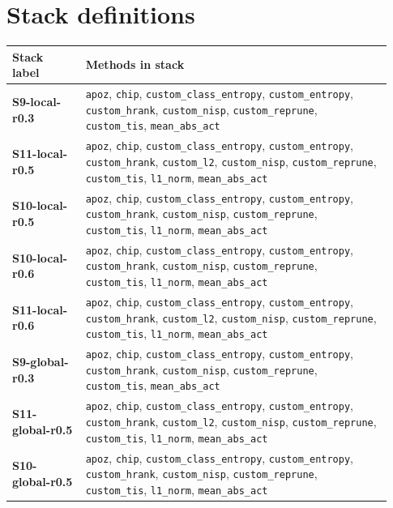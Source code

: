 \documentclass[11pt]{article}
\newcommand{\stackname}[1]{\textbf{#1}}
\begin{document}
\section*{Stack definitions}
\begin{longtable}{p{0.18\linewidth}p{0.75\linewidth}}\toprule Stack label & Methods in stack \\ \midrule
\stackname{S9-local-r0.3} & \texttt{apoz}, \texttt{chip}, \texttt{custom\_class\_entropy}, \texttt{custom\_entropy}, \texttt{custom\_hrank}, \texttt{custom\_nisp}, \texttt{custom\_reprune}, \texttt{custom\_tis}, \texttt{mean\_abs\_act} \\
\stackname{S11-local-r0.5} & \texttt{apoz}, \texttt{chip}, \texttt{custom\_class\_entropy}, \texttt{custom\_entropy}, \texttt{custom\_hrank}, \texttt{custom\_l2}, \texttt{custom\_nisp}, \texttt{custom\_reprune}, \texttt{custom\_tis}, \texttt{l1\_norm}, \texttt{mean\_abs\_act} \\
\stackname{S10-local-r0.5} & \texttt{apoz}, \texttt{chip}, \texttt{custom\_class\_entropy}, \texttt{custom\_entropy}, \texttt{custom\_hrank}, \texttt{custom\_nisp}, \texttt{custom\_reprune}, \texttt{custom\_tis}, \texttt{l1\_norm}, \texttt{mean\_abs\_act} \\
\stackname{S10-local-r0.6} & \texttt{apoz}, \texttt{chip}, \texttt{custom\_class\_entropy}, \texttt{custom\_entropy}, \texttt{custom\_hrank}, \texttt{custom\_nisp}, \texttt{custom\_reprune}, \texttt{custom\_tis}, \texttt{l1\_norm}, \texttt{mean\_abs\_act} \\
\stackname{S11-local-r0.6} & \texttt{apoz}, \texttt{chip}, \texttt{custom\_class\_entropy}, \texttt{custom\_entropy}, \texttt{custom\_hrank}, \texttt{custom\_l2}, \texttt{custom\_nisp}, \texttt{custom\_reprune}, \texttt{custom\_tis}, \texttt{l1\_norm}, \texttt{mean\_abs\_act} \\
\stackname{S9-global-r0.3} & \texttt{apoz}, \texttt{chip}, \texttt{custom\_class\_entropy}, \texttt{custom\_entropy}, \texttt{custom\_hrank}, \texttt{custom\_nisp}, \texttt{custom\_reprune}, \texttt{custom\_tis}, \texttt{mean\_abs\_act} \\
\stackname{S11-global-r0.5} & \texttt{apoz}, \texttt{chip}, \texttt{custom\_class\_entropy}, \texttt{custom\_entropy}, \texttt{custom\_hrank}, \texttt{custom\_l2}, \texttt{custom\_nisp}, \texttt{custom\_reprune}, \texttt{custom\_tis}, \texttt{l1\_norm}, \texttt{mean\_abs\_act} \\
\stackname{S10-global-r0.5} & \texttt{apoz}, \texttt{chip}, \texttt{custom\_class\_entropy}, \texttt{custom\_entropy}, \texttt{custom\_hrank}, \texttt{custom\_nisp}, \texttt{custom\_reprune}, \texttt{custom\_tis}, \texttt{l1\_norm}, \texttt{mean\_abs\_act} \\

\end{longtable}
\end{document}
